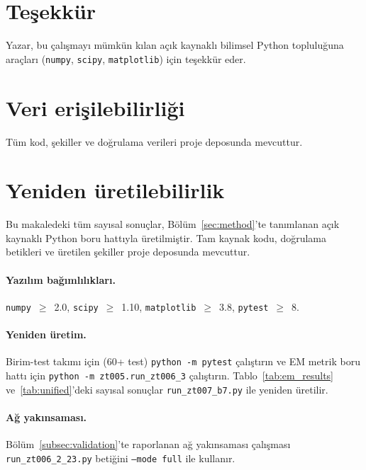 \documentclass[11pt,a4paper,twocolumn]{article}
\begin{document}
\section*{Teşekkür}
Yazar, bu çalışmayı mümkün kılan açık kaynaklı bilimsel Python
topluluğuna araçları (\texttt{numpy}, \texttt{scipy},
\texttt{matplotlib}) için teşekkür eder.

\section*{Veri erişilebilirliği}
Tüm kod, şekiller ve doğrulama verileri proje deposunda mevcuttur.





\appendix
\section{Yeniden üretilebilirlik}
\label{app:repro}

Bu makaledeki tüm sayısal sonuçlar, Bölüm~\ref{sec:method}'te
tanımlanan açık kaynaklı Python boru hattıyla üretilmiştir. Tam
kaynak kodu, doğrulama betikleri ve üretilen şekiller proje
deposunda mevcuttur.

\paragraph{Yazılım bağımlılıkları.}
\texttt{numpy}~$\geq$~2.0, \texttt{scipy}~$\geq$~1.10,
\texttt{matplotlib}~$\geq$~3.8, \texttt{pytest}~$\geq$~8.

\paragraph{Yeniden üretim.}
Birim-test takımı için (60+ test) \texttt{python -m pytest}
çalıştırın ve EM metrik boru hattı için
\texttt{python -m zt005.run\_zt006\_3} çalıştırın.
Tablo~\ref{tab:em_results} ve~\ref{tab:unified}'deki sayısal
sonuçlar \texttt{run\_zt007\_b7.py} ile yeniden üretilir.

\paragraph{Ağ yakınsaması.}
Bölüm~\ref{subsec:validation}'te raporlanan ağ yakınsaması
çalışması \texttt{run\_zt006\_2\_23.py} betiğini
\texttt{--mode full} ile kullanır.
\end{document}

